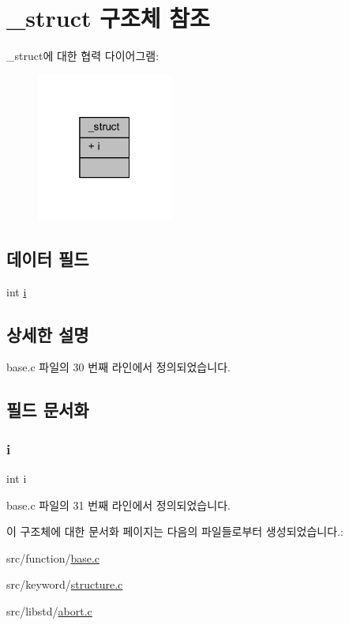 \hypertarget{struct__struct}{}\section{\+\_\+struct 구조체 참조}
\label{struct__struct}


\+\_\+struct에 대한 협력 다이어그램\+:
\nopagebreak
\begin{figure}[H]
\begin{center}
\leavevmode
\includegraphics[width=127pt]{struct__struct__coll__graph}
\end{center}
\end{figure}
\subsection*{데이터 필드}
\begin{DoxyCompactItemize}
\item 
int \hyperlink{struct__struct_acb559820d9ca11295b4500f179ef6392}{i}
\end{DoxyCompactItemize}


\subsection{상세한 설명}


base.\+c 파일의 30 번째 라인에서 정의되었습니다.



\subsection{필드 문서화}
\mbox{\label{struct__struct_acb559820d9ca11295b4500f179ef6392}} 
\subsubsection{\texorpdfstring{i}{i}}
{\footnotesize\ttfamily int i}



base.\+c 파일의 31 번째 라인에서 정의되었습니다.



이 구조체에 대한 문서화 페이지는 다음의 파일들로부터 생성되었습니다.\+:\begin{DoxyCompactItemize}
\item 
src/function/\hyperlink{function_2base_8c}{base.\+c}\item 
src/keyword/\hyperlink{structure_8c}{structure.\+c}\item 
src/libstd/\hyperlink{abort_8c}{abort.\+c}\end{DoxyCompactItemize}
